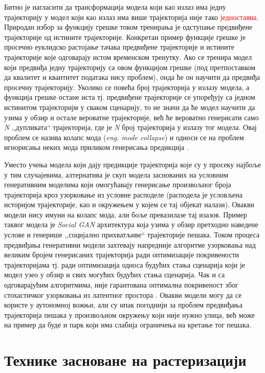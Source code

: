 \documentclass[11pt,oneside]{memoir}
\begin{document}
Битно је нагласити да трансформација модела који као излаз има једну трајекторију у модел који као излаз има више трајекторија није тако 
\textcolor{red}{једноставна.}
Природан избор за функцију грешке током тренирања је одступање предвиђене трајекторије од истините трајекторије. Конкретан пример
функције грешке је просечно еуклидско растојање тачака предвиђене трајекторије и истините трајекторије које одговарају истом временском тренутку. Ако
се тренира модел који предвиђа једну трајекторију са овом функцијом грешке (под претпоставком да квалитет и квантитет података нису проблем), 
онда ће он научити да предвиђа просечну трајекторију. Уколико се повећа број трајекторија у излазу модела, а функција грешке остане иста тј. предвиђене
трајекторије се упоређују са једном истинитом трајекторијм у сваком сценарију, то не значи да ће модел научити да узима у обзир и остале
вероватне трајекторије, већ ће вероватно генерисати само \textit{N} ,,дупликата`` трајекторија, где је \textit{N} број трајекторија у излазу 
тог модела. Овај проблем се назива колапс мода (\textit{eng. mode collapse}) и односи се на проблем игнорисања неких мода приликом генерисања предикција
\cite{overcoming_mode_collapse}.

Уместо учења модела који дају предикције трајекторија које су у просеку најбоље у тим случајевима, 
алтернатива је скуп модела заснованих на условним генеративним моделима који
омогућавају генерисање произвољног броја трајекторија кроз узорковање из условне расподеле 
(расподела је условљена историјом трајекторије, као и окружењем у којем се тај објекат налази). Овакви модели нису имуни на колапс мода,
али боље превазилазе тај изазов.
Пример таквог модела је \textit{Social GAN} \cite{social_gan} архитектура која узима у обзир претходно наведене услове и генерише ,,социјално прихватљиве`` 
трајекторије пешака. Током процеса предвиђања генеративни модели захтевају напредније алгоритме узорковања над великим бројем генерисаних
трајекторија ради оптимизације покривености трајекторијама тј. ради оптимизација 
односа будућих стања сценарија који је модел узео у обзир и свих могућих будућих стања сценарија. Чак и са одговарајућим алгоритмима,
није гарантована оптимална покривеност због стохастичког узорковања из латентног простора \cite{tnt}. Овакви модели могу да се користе
у аутономној вожњи, али су ипак погоднији за
проблем предвиђања трајекторија пешака у произвољном окружењу који није нужно улица, већ може на пример да буде и парк који има слабија ограничења
на кретање тог пешака.

\section{Технике засноване на растеризацији}
\end{document}
